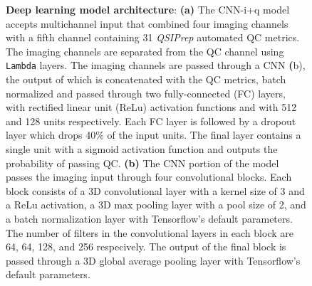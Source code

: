 \documentclass[fleqn,10pt]{wlscirep}
\begin{document}
\begin{figure}[tbp]
\begin{subfigure}[t]{0.4\textwidth}
    \end{subfigure}
    \caption{%
        {\bf Deep learning model architecture}:
        \textbf{(a)} The CNN-i+q model accepts multichannel input that combined
        four imaging channels with a fifth channel containing 31 \emph{QSIPrep}
        automated QC metrics. The imaging channels are separated from the QC
        channel using \texttt{Lambda} layers. The imaging channels are passed
        through a CNN \textbf(b), the output of which is concatenated with the
        QC metrics, batch normalized and passed through two fully-connected (FC)
        layers, with rectified linear unit (ReLu) activation functions and with
        512 and 128 units respectively. Each FC layer is followed by a dropout
        layer which drops 40\% of the input units. The final layer contains a
        single unit with a sigmoid activation function and outputs the
        probability of passing QC.
        \textbf{(b)} The CNN portion of the model passes the imaging input
        through four convolutional blocks. Each block consists of a 3D
        convolutional layer with a kernel size of 3 and a ReLu activation, a 3D
        max pooling layer with a pool size of 2, and a batch normalization layer
        with Tensorflow's default parameters. The number of filters in the
        convolutional layers in each block are 64, 64, 128, and 256 respecively.
        The output of the final block is passed through a 3D global average
        pooling layer with Tensorflow's default parameters.}
    \label{fig:dl-architecture}
\end{figure}

\end{document}
